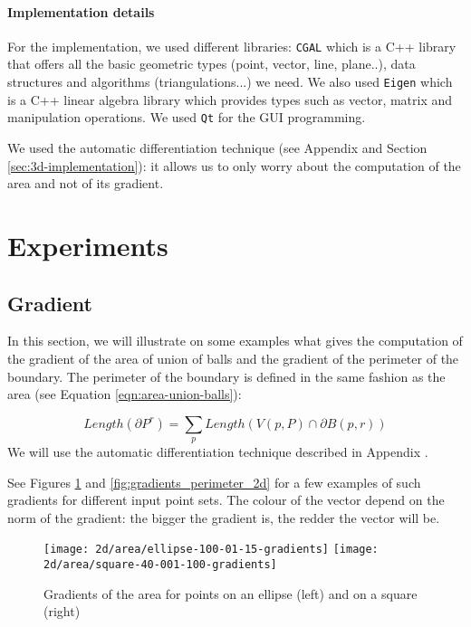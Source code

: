 \paragraph{Implementation details}

For the implementation, we used different libraries: \texttt{CGAL} which is a
C++ library that offers all the basic geometric types (point, vector, line,
plane..), data structures and algorithms (triangulations...) we need. We also used
\texttt{Eigen} which is a C++ linear algebra library which provides types such
as vector, matrix and manipulation operations. We used \texttt{Qt} for the GUI
programming.

We used the automatic differentiation technique (see Appendix
 and Section \ref{sec:3d-implementation}): it allows
us to only worry about the computation of the area and not of its gradient.

\section{Experiments}

\subsection{Gradient}

In this section, we will illustrate on some examples what gives the computation
of the gradient of the area of union of balls and the gradient of the perimeter
of the boundary. The perimeter of the boundary is defined in the same fashion as
the area (see Equation \eqref{eqn:area-union-balls}):

\begin{equation}
    Length(\partial P^r) = \sum_p Length(V(p, P) \cap \partial B(p, r))
\end{equation}
We will use the automatic differentiation technique described in Appendix
.

See Figures \ref{fig:gradients_area_2d} and \ref{fig:gradients_perimeter_2d} for
a few examples of such gradients for different input point sets. The colour of
the vector depend on the norm of the gradient: the bigger the gradient is, the
redder the vector will be.

\begin{figure}[h]
    \centering

    \texttt{[image: 2d/area/ellipse-100-01-15-gradients]}
    \texttt{[image: 2d/area/square-40-001-100-gradients]}
    \caption{Gradients of the area for points on an ellipse (left) and on a
        square (right)}
    \label{fig:gradients_area_2d}
\end{figure}

